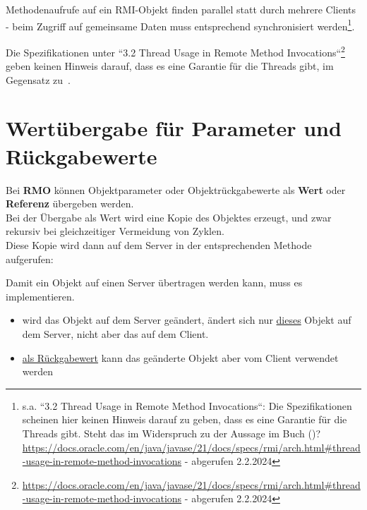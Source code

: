 \begin{tcolorbox}[enlarge top by=0.5cm,enlarge bottom by=0.5cm]
    Methodenaufrufe auf ein RMI-Objekt finden parallel statt durch mehrere Clients - beim Zugriff auf gemeinsame Daten muss entsprechend synchronisiert werden\footnote{
        s.a. ``3.2 Thread Usage in Remote Method Invocations``: Die Spezifikationen scheinen hier keinen Hinweis darauf zu geben, dass es eine Garantie für die Threads gibt. Steht das im Widerspruch zu der Aussage im Buch (\cite[330]{Oec22})? \url{https://docs.oracle.com/en/java/javase/21/docs/specs/rmi/arch.html#thread-usage-in-remote-method-invocations} - abgerufen 2.2.2024
    }.
\end{tcolorbox}

\begin{tcolorbox}[colback=red!20,color=white,title=Anmerkung]
    Die Spezifikationen unter ``3.2 Thread Usage in Remote Method Invocations``\footnote{
        \url{https://docs.oracle.com/en/java/javase/21/docs/specs/rmi/arch.html#thread-usage-in-remote-method-invocations} - abgerufen 2.2.2024
    } geben keinen Hinweis darauf, dass es eine Garantie für die Threads gibt, im Gegensatz zu~\cite[330]{Oec22}.
\end{tcolorbox}

\section{Wertübergabe für Parameter und Rückgabewerte}\label{sec:valuermi}

Bei \textbf{RMO} können Objektparameter oder Objektrückgabewerte als \textbf{Wert} oder \textbf{Referenz} übergeben werden.\\

\noindent
Bei der Übergabe als Wert wird eine Kopie des Objektes erzeugt, und zwar rekursiv bei gleichzeitiger Vermeidung von Zyklen.\\

\noindent
Diese Kopie wird dann auf dem Server in der entsprechenden Methode aufgerufen:

\begin{tcolorbox}[enlarge top by=0.5cm,enlarge bottom by=0.5cm]
    Damit ein Objekt auf einen Server übertragen werden kann, muss es  implementieren.
\end{tcolorbox}

\begin{itemize}
    \item wird das Objekt auf dem Server geändert, ändert sich nur \ul{dieses} Objekt auf dem Server, nicht aber das auf dem Client.
    \item \ul{als Rückgabewert} kann das geänderte Objekt aber vom Client verwendet werden
\end{itemize}

